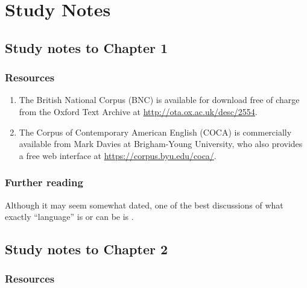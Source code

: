 \chapter{Study Notes}
\label{ch:studynotes}

\section*{Study notes to Chapter 1}
\label{sec:studynotes01}

\subsection*{Resources}

\begin{enumerate}
  \item The British National Corpus (BNC) is available for download free of charge from the Oxford Text Archive at \url{http://ota.ox.ac.uk/desc/2554}.
  \item The Corpus of Contemporary American English (COCA) is commercially available from Mark Davies at Brigham-Young University, who also provides a free web interface at \url{https://corpus.byu.edu/coca/}.
\end{enumerate}

\subsection*{Further reading}

Although it may seem somewhat dated, one of the best discussions of what exactly ``language'' is or can be is \citet{lyons_language_1981}.

\section*{Study notes to Chapter 2}
\label{sec:studynotes02}

\subsection*{Resources}


